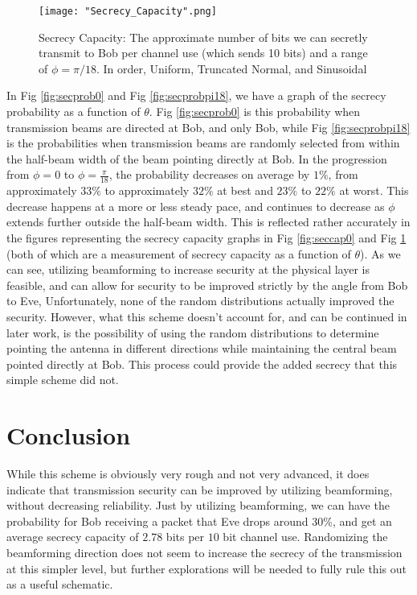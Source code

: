 \documentclass[letterpaper, 10 pt, conference]{ieeetran}  %
\theoremstyle{definition}
\theoremstyle{theorem}
\begin{document}
\begin{figure}
\centering
\texttt{[image: "Secrecy\_Capacity".png]}
\caption{Secrecy Capacity: The approximate number of bits we can secretly transmit to Bob per channel use (which sends 10 bits) and a range of $\phi=\pi/18$.  In order, Uniform, Truncated Normal, and Sinusoidal}
\label{fig:seccappi18}
\end{figure}

In Fig \ref{fig:secprob0} and Fig \ref{fig:secprobpi18}, we have a graph of the secrecy probability as a function of $\theta$.    
Fig \ref{fig:secprob0} is this probability when transmission beams are directed at Bob, and only Bob, while Fig \ref{fig:secprobpi18} is the probabilities when transmission beams are randomly selected from within the half-beam width of the beam pointing directly at Bob.  
In the progression from $\phi = 0$ to $\phi = \frac{\pi}{18}$, the probability decreases on average by $1\%$, from approximately $33\%$ to approximately $32\%$ at best and $23\%$ to $22\%$ at worst.  
This decrease happens at a more or less steady pace, and continues to decrease as $\phi$ extends further outside the half-beam width.  
This is reflected rather accurately in the figures representing the secrecy capacity graphs in Fig \ref{fig:seccap0} and Fig \ref{fig:seccappi18} (both of which are a measurement of secrecy capacity as a function of $\theta$).  
As we can see, utilizing beamforming to increase security at the physical layer is feasible, and can allow for security to be improved strictly by the angle from Bob to Eve,  
Unfortunately, none of the random distributions actually improved the security.  
However, what this scheme doesn't account for, and can be continued in later work, is the possibility of using the random distributions to determine pointing the antenna in different directions while maintaining the central beam pointed directly at Bob.  
This process could provide the added secrecy that this simple scheme did not.

\section{Conclusion}
\label{sec:conc}
While this scheme is obviously very rough and not very advanced, it does indicate that transmission security can be improved by utilizing beamforming, without decreasing reliability.  
Just by utilizing beamforming, we can have the probability for Bob receiving a packet that Eve drops around 30\%, and get an average secrecy capacity of $2.78$ bits per $10$ bit channel use.  
Randomizing the beamforming direction does not seem to increase the secrecy of the transmission at this simpler level, but further explorations will be needed to fully rule this out as a useful schematic. 
\end{document}
